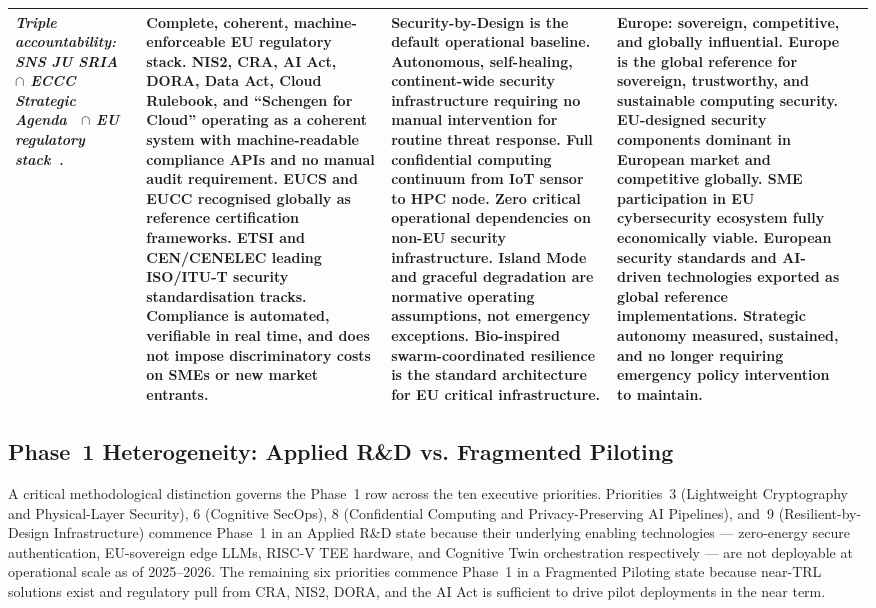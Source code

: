 \begin{longtable}{|p{1.7cm}|p{2.2cm}|p{2.2cm}|p{2.2cm}|p{2.2cm}|}
\smallskip
\textit{Triple accountability: SNS JU SRIA~\cite{snsju} $\cap$ ECCC
Strategic Agenda~\cite{eccc} $\cap$ EU regulatory stack~\cite{nis2}.}
&
\footnotesize
\textbf{Complete, coherent, machine-enforceable EU regulatory stack.}
NIS2, CRA, AI Act, DORA, Data Act, Cloud Rulebook, and ``Schengen
for Cloud'' operating as a coherent system with machine-readable
compliance APIs and no manual audit requirement. EUCS and EUCC
recognised globally as reference certification frameworks. ETSI and
CEN/CENELEC leading ISO/ITU-T security standardisation tracks.
Compliance is automated, verifiable in real time, and does not
impose discriminatory costs on SMEs or new market entrants.
&
\footnotesize
\textbf{Security-by-Design is the default operational baseline.}
Autonomous, self-healing, continent-wide security infrastructure
requiring no manual intervention for routine threat response. Full
confidential computing continuum from IoT sensor to HPC node. Zero
critical operational dependencies on non-EU security infrastructure.
Island Mode and graceful degradation are normative operating
assumptions, not emergency exceptions. Bio-inspired swarm-coordinated
resilience is the standard architecture for EU critical infrastructure.
&
\footnotesize
\textbf{Europe: sovereign, competitive, and globally influential.}
Europe is the global reference for sovereign, trustworthy, and
sustainable computing security. EU-designed security components
dominant in European market and competitive globally. SME participation
in EU cybersecurity ecosystem fully economically viable. European
security standards and AI-driven technologies exported as global
reference implementations. Strategic autonomy measured, sustained,
and no longer requiring emergency policy intervention to maintain.
\\
\hline

\end{longtable}
\endgroup

\subsection*{Phase~1 Heterogeneity: Applied R\&D vs. Fragmented Piloting}

A critical methodological distinction governs the Phase~1 row across the
ten executive priorities. Priorities~3 (Lightweight Cryptography and
Physical-Layer Security), 6 (Cognitive SecOps), 8 (Confidential Computing
and Privacy-Preserving AI Pipelines), and~9 (Resilient-by-Design
Infrastructure) commence Phase~1 in an Applied R\&D state because their
underlying enabling technologies --- zero-energy secure authentication,
EU-sovereign edge LLMs, RISC-V TEE hardware, and Cognitive Twin
orchestration respectively --- are not deployable at operational scale
as of 2025--2026. The remaining six priorities commence Phase~1 in a
Fragmented Piloting state because near-TRL solutions exist and regulatory
pull from CRA, NIS2, DORA, and the AI Act is sufficient to drive pilot
deployments in the near term.

